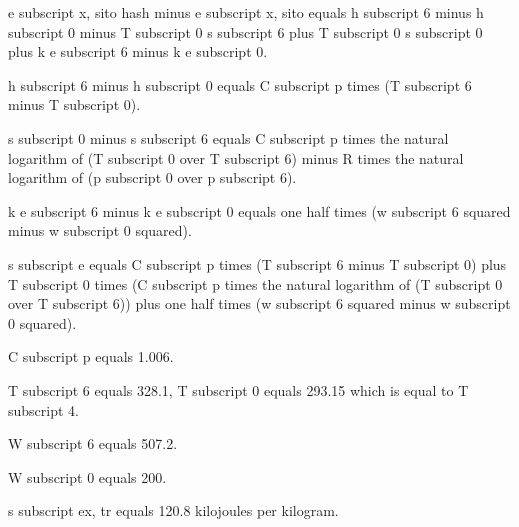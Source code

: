e subscript x, sito hash minus e subscript x, sito equals h subscript 6 minus h subscript 0 minus T subscript 0 s subscript 6 plus T subscript 0 s subscript 0 plus k e subscript 6 minus k e subscript 0.

h subscript 6 minus h subscript 0 equals C subscript p times (T subscript 6 minus T subscript 0).

s subscript 0 minus s subscript 6 equals C subscript p times the natural logarithm of (T subscript 0 over T subscript 6) minus R times the natural logarithm of (p subscript 0 over p subscript 6).

k e subscript 6 minus k e subscript 0 equals one half times (w subscript 6 squared minus w subscript 0 squared).

s subscript e equals C subscript p times (T subscript 6 minus T subscript 0) plus T subscript 0 times (C subscript p times the natural logarithm of (T subscript 0 over T subscript 6)) plus one half times (w subscript 6 squared minus w subscript 0 squared).

C subscript p equals 1.006.

T subscript 6 equals 328.1, T subscript 0 equals 293.15 which is equal to T subscript 4.

W subscript 6 equals 507.2.

W subscript 0 equals 200.

s subscript ex, tr equals 120.8 kilojoules per kilogram.